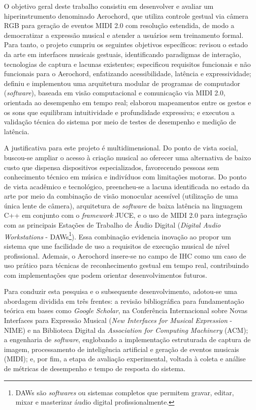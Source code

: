 O objetivo geral deste trabalho consistiu em desenvolver e avaliar um hiperinstrumento denominado Aerochord, que utiliza controle gestual via câmera RGB para geração de eventos MIDI 2.0 com resolução estendida, de modo a democratizar a expressão musical e atender a usuários sem treinamento formal. Para tanto, o projeto cumpriu os seguintes objetivos específicos: revisou o estado da arte em interfaces musicais gestuais, identificando paradigmas de interação, tecnologias de captura e lacunas existentes; especificou requisitos funcionais e não funcionais para o Aerochord, enfatizando acessibilidade, latência e expressividade; definiu e implementou uma arquitetura modular de programas de computador (\textit{software}), baseada em visão computacional e comunicação via MIDI 2.0, orientada ao desempenho em tempo real; elaborou mapeamentos entre os gestos e os sons que equilibram intuitividade e profundidade expressiva; e executou a validação técnica do sistema por meio de testes de desempenho e medição de latência.

A justificativa para este projeto é multidimensional. Do ponto de vista social, buscou-se ampliar o acesso à criação musical ao oferecer uma alternativa de baixo custo que dispensa dispositivos especializados, favorecendo pessoas sem conhecimento técnico em música e indivíduos com limitações motoras. Do ponto de vista acadêmico e tecnológico, preencheu-se a lacuna identificada no estado da arte por meio da combinação de visão monocular acessível (utilização de uma única lente de câmera), arquitetura de \textit{software} de baixa latência na linguagem C++ em conjunto com o \textit{framework} JUCE, e o uso de MIDI 2.0 para integração com as principais Estações de Trabalho de Áudio Digital (\textit{Digital Audio Workstations} - DAWs\footnote{DAWs são \textit{softwares} ou sistemas completos que permitem gravar, editar, mixar e masterizar áudio digital profissionalmente.}). Essa combinação evidencia inovação ao propor um sistema que une facilidade de uso a requisitos de execução musical de nível profissional. Ademais, o Aerochord insere-se no campo de IHC como um caso de uso prático para técnicas de reconhecimento gestual em tempo real, contribuindo com implementações que podem orientar desenvolvimentos futuros.

Para conduzir esta pesquisa e o subsequente desenvolvimento, adotou-se uma abordagem dividida em três frentes: a revisão bibliográfica para fundamentação teórica em bases como \textit{Google Scholar}, na Conferência Internacional sobre Novas Interfaces para Expressão Musical (\textit{New Interfaces for Musical Expression} - NIME) e na Biblioteca Digital da \textit{Association for Computing Machinery} (ACM); a engenharia de \textit{software}, englobando a implementação estruturada de captura de imagem, processamento de inteligência artificial e geração de eventos musicais (MIDI); e, por fim, a etapa de avaliação experimental, voltada à coleta e análise de métricas de desempenho e tempo de resposta do sistema.

